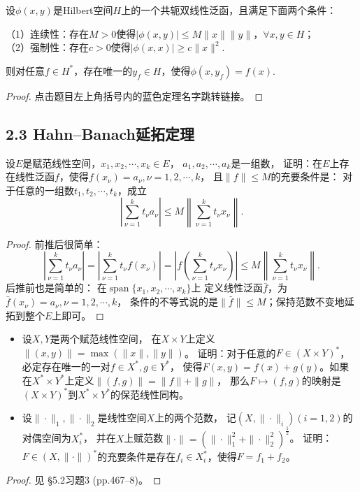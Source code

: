\begin{12}
    设$\phi(x,y)$是Hilbert空间$H$上的一个共轭双线性泛函，且满足下面两个条件：

    （1）连续性：存在$M>0$使得$|\phi(x,y)|\leqslant M\|x\|\|y\|$，$\forall x,y\in H$；\\
    （2）强制性：存在$c>0$使得$|\phi(x,x)|\geqslant c\|x\|^2$.

    则对任意$f \in H^*$，存在唯一的$y_f \in H$，使得$\phi(x,y_f)=f(x)$.
\end{12}
\begin{proof}
    点击题目左上角括号内的蓝色定理名字跳转链接。
\end{proof}

\subsection{2.3 Hahn--Banach延拓定理}
\begin{1}
    设$E$是赋范线性空间，$x_1,x_2,\cdots,x_k \in E$，
    $a_1,a_2,\cdots,a_k$是一组数，
    证明：在$E$上存在线性泛函$f$，使得$f(x_\nu)=a_\nu,\nu=1,2,\cdots,k$，
    且$\|f\| \leqslant M$的充要条件是：
    对于任意的一组数$t_1,t_2,\cdots,t_k$，成立
    \[\left|\sum_{\nu=1}^k t_\nu a_\nu\right|
    \leqslant M\left\|\sum_{\nu=1}^k t_\nu x_\nu\right\|.\]
\end{1}
\begin{proof}
    前推后很简单：
    \[\left|\sum_{\nu=1}^k t_\nu a_\nu\right|
    =\left|\sum_{\nu=1}^k t_\nu f(x_\nu)\right|
    =\left|f\left(\sum_{\nu=1}^k t_\nu x_\nu\right)\right|
    \leqslant M\left\|\sum_{\nu=1}^k t_\nu x_\nu\right\|.\]
    后推前也是简单的：
    在$\operatorname{span}\{x_1,x_2,\cdots,x_k\}$上
    定义线性泛函$\bar{f}$，为$\bar{f}(x_\nu)=a_\nu,\nu=1,2,\cdots,k$，
    条件的不等式说的是$\|\bar{f}\| \leqslant M$；保持范数不变地延拓到整个$E$上即可。
\end{proof}

\begin{3}
    \begin{itemize}
        \item[(i)] 设$X,Y$是两个赋范线性空间，
        在$X \times Y$上定义$\|(x,y)\|=\max(\|x\|,\|y\|)$。
        证明：对于任意的$F\in(X \times Y)^*$，必定存在唯一的一对$f \in X^*,g \in Y^*$，
        使得$F(x,y)=f(x)+g(y)$。如果在$X^* \times Y^*$上定义$\|(f,g)\|=\|f\|+\|g\|$，
        那么$F\mapsto(f,g)$的映射是$(X \times Y)^*$到$X^* \times Y^*$的保范线性同构。
        \item[(ii)] 设$\|\cdot\|_1,\|\cdot\|_2$是线性空间$X$上的两个范数，
        记$(X,\|\cdot\|_i)(i=1,2)$的对偶空间为$X_i^*$，
        并在$X$上赋范数$\|\cdot\|=(\|\cdot\|_1^2+\|\cdot\|_2^2)^\frac{1}{2}$。
        证明：$F\in(X,\|\cdot\|)^*$的充要条件是存在$f_i \in X_i^*$，使得$F=f_1+f_2$。
    \end{itemize}
\end{3}
\begin{proof}
    见\cite{Xia} \S5.2习题3 (pp.467--8)。
\end{proof}

